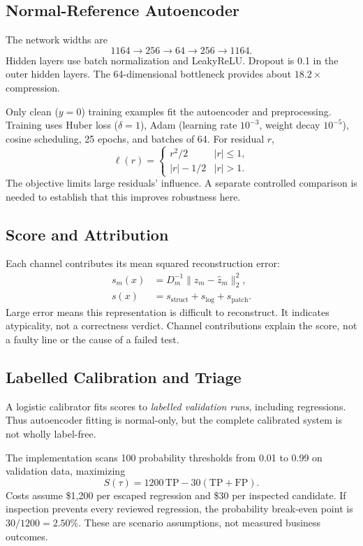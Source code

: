 \subsection{Normal-Reference Autoencoder}
The network widths are
\begin{equation}
1164\rightarrow256\rightarrow64\rightarrow256\rightarrow1164.
\end{equation}
Hidden layers use batch normalization and LeakyReLU. Dropout is 0.1 in the outer hidden layers. The 64-dimensional bottleneck provides about $18.2\times$ compression.

Only clean ($y=0$) training examples fit the autoencoder and preprocessing. Training uses Huber loss ($\delta=1$), Adam (learning rate $10^{-3}$, weight decay $10^{-5}$), cosine scheduling, 25 epochs, and batches of 64. For residual $r$,
\begin{equation}
\ell(r)=\begin{cases}r^2/2 & |r|\leq1,\\ |r|-1/2 & |r|>1.\end{cases}
\end{equation}
The objective limits large residuals' influence. A separate controlled comparison is needed to establish that this improves robustness here.

\subsection{Score and Attribution}
Each channel contributes its mean squared reconstruction error:
\begin{align}
s_m(x)&=D_m^{-1}\|z_m-\hat z_m\|_2^2,\\
s(x)&=s_{\mathrm{struct}}+s_{\mathrm{log}}+s_{\mathrm{patch}}.
\label{eq:additive}
\end{align}
Large error means this representation is difficult to reconstruct. It indicates atypicality, not a correctness verdict. Channel contributions explain the score, not a faulty line or the cause of a failed test.

\subsection{Labelled Calibration and Triage}
A logistic calibrator fits scores to \emph{labelled validation runs}, including regressions. Thus autoencoder fitting is normal-only, but the complete calibrated system is not wholly label-free.

The implementation scans 100 probability thresholds from 0.01 to 0.99 on validation data, maximizing
\begin{equation}
S(\tau)=1200\,\mathrm{TP}-30(\mathrm{TP}+\mathrm{FP}).
\end{equation}
Costs assume \$1,200 per escaped regression and \$30 per inspected candidate. If inspection prevents every reviewed regression, the probability break-even point is $30/1200=2.50\%$. These are scenario assumptions, not measured business outcomes.

